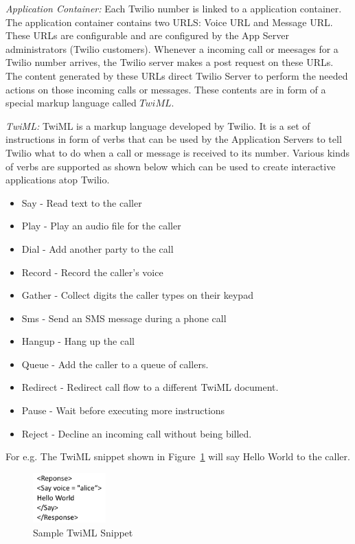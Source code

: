 \emph{Application Container: } Each Twilio number is linked to a application container. The application container contains two URLS: Voice URL and Message URL. These URLs are configurable and are configured by the App Server administrators (Twilio customers). Whenever a incoming call or meesages for a Twilio number arrives, the Twilio server makes a post request on these URLs. The content generated by these URLs direct Twilio Server to perform the needed actions on those incoming calls or messages. These contents are in form of a special markup language called $TwiML$.

\emph{TwiML:  } TwiML is a markup language developed by Twilio. It is a set of instructions in form of verbs that can be used by the Application Servers to tell Twilio what to do when a call or message is received to its number. Various kinds of verbs are supported as shown below which can be used to create interactive applications atop Twilio.
\begin{itemize}
\item  Say - Read text to the caller 
\item Play - Play an audio file for the caller
\item Dial - Add another party to the call
\item Record - Record the caller's voice
\item Gather - Collect digits the caller types on their keypad
\item Sms - Send an SMS message during a phone call
\item Hangup - Hang up the call
\item Queue - Add the caller to a queue of callers.
\item Redirect - Redirect call flow to a different TwiML document.
\item Pause - Wait before executing more instructions
\item Reject - Decline an incoming call without being billed.
\end{itemize}

For e.g. The TwiML snippet shown in Figure~\ref{fig:TwilML} will say Hello World to the caller.
 
\begin{figure}
\centering
  \includegraphics[width=0.25\textwidth]{figs/TwiML.png}
\caption{Sample TwiML Snippet}
\label{fig:TwilML}
\end{figure} 

